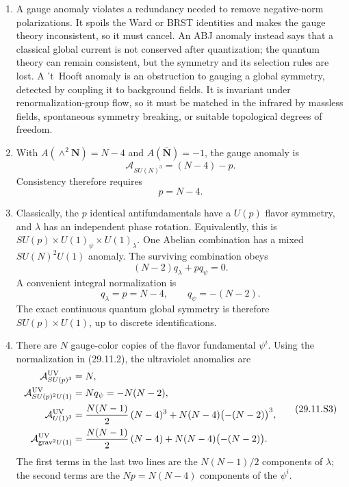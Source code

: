 \begin{enumerate}
  \begin{enumerate}
    \item[(a)]
    A gauge anomaly violates a redundancy needed to remove negative-norm
    polarizations.  It spoils the Ward or BRST identities and makes the
    gauge theory inconsistent, so it must cancel.  An ABJ anomaly instead
    says that a classical global current is not conserved after
    quantization; the quantum theory can remain consistent, but the
    symmetry and its selection rules are lost.  A 't~Hooft anomaly is an
    obstruction to gauging a global symmetry, detected by coupling it to
    background fields.  It is invariant under renormalization-group flow,
    so it must be matched in the infrared by massless fields, spontaneous
    symmetry breaking, or suitable topological degrees of freedom.

    \item[(i)]
    With \(A(\wedge^2\boldsymbol N)=N-4\) and
    \(A(\overline{\boldsymbol N})=-1\), the gauge anomaly is
    \[
      \mathcal A_{SU(N)^3}=(N-4)-p.
    \]
    Consistency therefore requires
    \[
      \boxed{p=N-4.}
      \tag{29.11.S1}
    \]

    \item[(ii)]
    Classically, the \(p\) identical antifundamentals have a \(U(p)\)
    flavor symmetry, and \(\lambda\) has an independent phase rotation.
    Equivalently, this is
    \(SU(p)\times U(1)_\psi\times U(1)_\lambda\).
    One Abelian combination has a mixed \(SU(N)^2U(1)\) anomaly.  The
    surviving combination obeys
    \[
      (N-2)q_\lambda+p q_\psi=0.
    \]
    A convenient integral normalization is
    \[
      \boxed{q_\lambda=p=N-4,\qquad q_\psi=-(N-2).}
      \tag{29.11.S2}
    \]
    The exact continuous quantum global symmetry is therefore
    \(SU(p)\times U(1)\), up to discrete identifications.

    \item[(iii)]
    There are \(N\) gauge-color copies of the flavor fundamental
    \(\psi^i\).  Using the normalization in (29.11.2), the ultraviolet
    anomalies are
    \[
    \begin{aligned}
      \mathcal A_{SU(p)^3}^{\rm UV}
        &=N,\\
      \mathcal A_{SU(p)^2U(1)}^{\rm UV}
        &=Nq_\psi=-N(N-2),\\
      \mathcal A_{U(1)^3}^{\rm UV}
        &=\frac{N(N-1)}2\,(N-4)^3
          +N(N-4)\bigl(-(N-2)\bigr)^3,\\
      \mathcal A_{\mathrm{grav}^2U(1)}^{\rm UV}
        &=\frac{N(N-1)}2\,(N-4)
          +N(N-4)\bigl(-(N-2)\bigr).
    \end{aligned}
    \tag{29.11.S3}
    \]
    The first terms in the last two lines are the
    \(N(N-1)/2\) components of \(\lambda\); the second terms are the
    \(Np=N(N-4)\) components of the \(\psi^i\).


\end{enumerate}
\end{enumerate}
